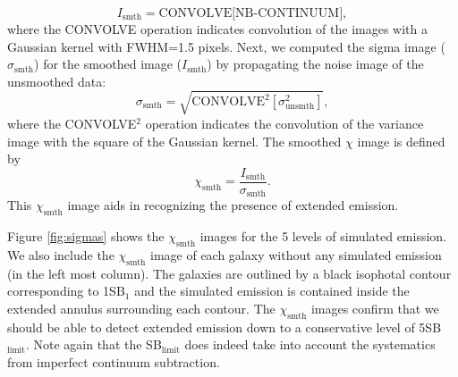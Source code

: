 \documentclass[twocolumn]{aastex61}
\begin{document}
\begin{equation}
I_{\text{smth}}= \text{CONVOLVE[NB-CONTINUUM]},
\end{equation}
where the CONVOLVE operation indicates convolution of the images with a Gaussian kernel with FWHM=1.5 pixels. Next, we computed the sigma image ($\sigma_{\text{smth}}$) for the smoothed image ($I_{\text{smth}}$) by propagating the noise image of the unsmoothed data:
\begin{equation}
\sigma_{\text{smth}}=\sqrt{\text{CONVOLVE}^2[\sigma^2_{\text{unsmth}}]},
\end{equation}
where the CONVOLVE$^2$ operation indicates the convolution of the variance image with the square of the Gaussian kernel. The smoothed $\chi$ image is defined by
\begin{equation}
\chi_{\text{smth}}=\frac{I_{\text{smth}}}{\sigma_{\text{smth}}}.
\end{equation}
This $\chi_{\text{smth}}$ image aids in recognizing the presence of extended  emission. 

Figure \ref{fig:sigmas} shows the $\chi_{\text{smth}}$ images for the 5 levels of simulated  emission. We also include the $\chi_{\text{smth}}$ image of each galaxy without any simulated emission (in the left most column). The galaxies are outlined by a black isophotal contour corresponding to 1SB$_1$ and the simulated emission is contained inside the extended annulus surrounding each contour. The  $\chi_{\text{smth}}$ images confirm that we should be able to detect extended  emission down to a conservative level of 5SB$_{\text{limit}}$. Note again that the SB$_{\text{limit}}$ does indeed take into account the systematics from imperfect continuum subtraction. 

\end{document}
